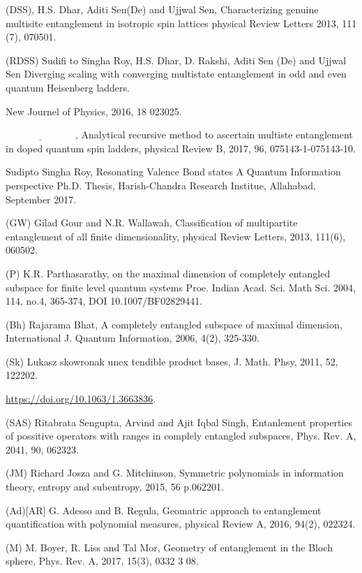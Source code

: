 \documentclass[a4paper,12pt]{article}
\theoremstyle{definition}
\theoremstyle{underlinethm}
\theoremstyle{definition}
\begin{document}
\begin{thebibliography}{99}
\bibitem{} (DSS), H.S. Dhar, Aditi Sen(De) and Ujjwal Sen, Characterizing genuine multisite entanglement in isotropic spin lattices physical Review Letters 2013, 111 (7), 070501.

\bibitem{} (RDSS) Sudifi to Singha Roy, H.S. Dhar, D. Rakshi, Aditi Sen (De) and Ujjwal Sen Diverging scaling with converging multistate entanglement in odd and even quantum Heisenberg ladders. 

New Journel of Physics, 2016, 18 023025.

\bibitem{} $\underline{\hspace{3cm}}$, Analytical recursive method to ascertain multiste entanglement in doped quantum spin ladders, physical Review B, 2017, 96, 075143-1-075143-10.

\bibitem{} Sudipto Singha Roy, Resonating Valence Bond states A Quantum Information perspective Ph.D. Thesis, Harish-Chandra Research Institue, Allahabad, September 2017.

\bibitem{} (GW) Gilad Gour and N.R. Wallawah, Classification of multipartite entanglement of all finite dimensionality, physical Review Letters, 2013, 111(6), 060502.

\bibitem{} (P) K.R. Parthasarathy, on the maximal dimension of completely entangled subspace for finite level quantum systems Proe. Indian Acad. Sci. Math Sci. 2004, 114, no.4, 365-374, DOI 10.1007/BF02829441.

\bibitem{} (Bh) Rajarama Bhat, A completely entangled subspace of maximal dimension, International J. Quantum Information, 2006, 4(2), 325-330.

\bibitem{} (Sk) Lukasz skowronak unex tendible product bases, J. Math. Phsy, 2011, 52, 122202. 

\url{https://doi.org/10.1063/1.3663836}.

\bibitem{} (SAS) Ritabrata Sengupta, Arvind and Ajit Iqbal Singh, Entanlement properties of possitive operators with ranges in complely entangled subspaces, Phys. Rev. A, 2041, 90, 062323.

\bibitem{} (JM) Richard Josza and G. Mitchinson, Symmetric polynomials in information theory, entropy and subentropy, 2015, 56 p.062201.

\bibitem{} (Ad)[AR] G. Adesso and B. Regula, Geomatric approach to entanglement quantification with polynomial measures, physical Review A, 2016, 94(2), 022324.

\bibitem{} (M) M. Boyer, R. Liss and Tal Mor, Geometry of entanglement in the Bloch sphere, Phys. Rev. A, 2017, 15(3), 0332 3 08.


\end{thebibliography}
\end{document}
